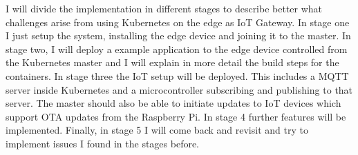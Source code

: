I will divide the implementation in different stages to describe better what challenges arise from using Kubernetes on the edge as IoT Gateway. In stage one I just setup the system, installing the edge device and joining it to the master. In stage two, I will deploy a example application to the edge device controlled from the Kubernetes master and I will explain in more detail the build steps for the containers. In stage three the IoT setup will be deployed. This includes a MQTT server inside Kubernetes and a microcontroller subscribing and publishing to that server. The master should also be able to initiate updates to IoT devices which support OTA updates from the Raspberry Pi. In stage 4 further features will be implemented. Finally, in stage 5 I will come back and revisit and try to implement issues I found in the stages before.\\










